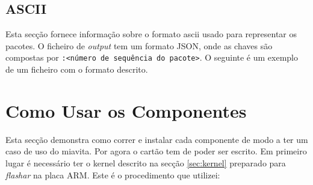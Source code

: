 \documentclass[10pt,a4paper,oneside]{book}
\begin{document}
  \section{ASCII}
  
  	Esta secção fornece informação sobre o formato ascii usado para representar os pacotes. O ficheiro de \emph{output} tem um formato JSON, onde as chaves são compostas por {\tt <identificador do nó>:<número de sequência do pacote>}. O seguinte é um exemplo de um ficheiro com o formato descrito.

    
  
  
\chapter{Como Usar os Componentes}

	Esta secção demonstra como correr e instalar cada componente de modo a ter um caso de uso do miavita. Por agora o cartão tem de poder ser escrito. Em primeiro lugar é necessário ter o kernel descrito na secção \ref{sec:kernel} preparado para \emph{flashar} na placa ARM. Este é o procedimento que utilizei:
	
\end{document}
